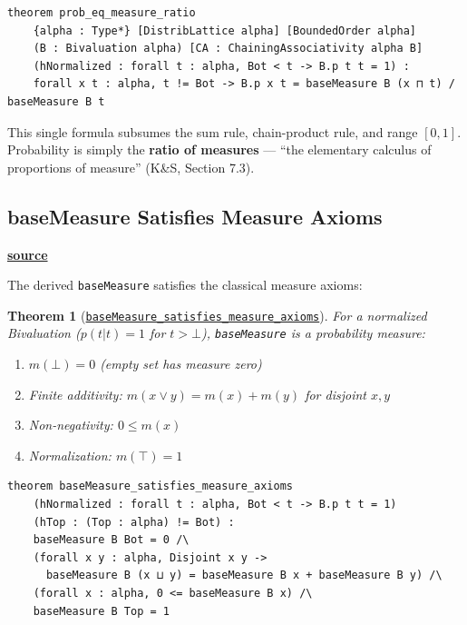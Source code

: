 \documentclass[11pt]{article}
\newtheorem{theorem}{Theorem}[section]
\theoremstyle{definition}
\theoremstyle{remark}
\begin{document}
\begin{lstlisting}[caption={\texttt{prob\_eq\_measure\_ratio} (\href{https://github.com/zariuq/ks-foundations-of-inference/blob/main/KnuthSkilling/Probability/ConditionalProbability/Basic.lean}{Basic.lean})},numbers=none]
theorem prob_eq_measure_ratio
    {alpha : Type*} [DistribLattice alpha] [BoundedOrder alpha]
    (B : Bivaluation alpha) [CA : ChainingAssociativity alpha B]
    (hNormalized : forall t : alpha, Bot < t -> B.p t t = 1) :
    forall x t : alpha, t != Bot -> B.p x t = baseMeasure B (x ⊓ t) / baseMeasure B t
\end{lstlisting}

This single formula subsumes the sum rule, chain-product rule, and range $[0,1]$. Probability is simply the \textbf{ratio of measures} --- ``the elementary calculus of proportions of measure'' (K\&S, Section 7.3).

\subsection{baseMeasure Satisfies Measure Axioms}

\textbf{\href{https://github.com/zariuq/ks-foundations-of-inference/blob/main/KnuthSkilling/Probability/ConditionalProbability/Basic.lean}{source}}

The derived \texttt{baseMeasure} satisfies the classical measure axioms:

\begin{theorem}[\href{https://github.com/zariuq/ks-foundations-of-inference/blob/main/KnuthSkilling/Probability/ConditionalProbability/Basic.lean}{\texttt{baseMeasure\_satisfies\_measure\_axioms}}]
For a normalized Bivaluation ($p(t|t) = 1$ for $t > \bot$), \texttt{baseMeasure} is a probability measure:
\begin{enumerate}
\item $m(\bot) = 0$ (empty set has measure zero)
\item Finite additivity: $m(x \vee y) = m(x) + m(y)$ for disjoint $x, y$
\item Non-negativity: $0 \leq m(x)$
\item Normalization: $m(\top) = 1$
\end{enumerate}
\end{theorem}

\begin{lstlisting}[caption={\texttt{baseMeasure\_satisfies\_measure\_axioms} (\href{https://github.com/zariuq/ks-foundations-of-inference/blob/main/KnuthSkilling/Probability/ConditionalProbability/Basic.lean}{Basic.lean})},numbers=none]
theorem baseMeasure_satisfies_measure_axioms
    (hNormalized : forall t : alpha, Bot < t -> B.p t t = 1)
    (hTop : (Top : alpha) != Bot) :
    baseMeasure B Bot = 0 /\
    (forall x y : alpha, Disjoint x y ->
      baseMeasure B (x ⊔ y) = baseMeasure B x + baseMeasure B y) /\
    (forall x : alpha, 0 <= baseMeasure B x) /\
    baseMeasure B Top = 1
\end{lstlisting}
\end{document}
